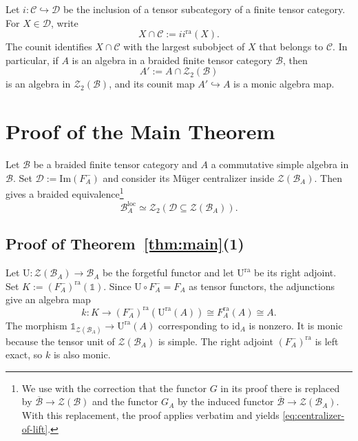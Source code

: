 \documentclass[11pt,reqno]{amsart}
\numberwithin{equation}{section}
\theoremstyle{plain}
\theoremstyle{definition}
\theoremstyle{remark}
\newcommand{\unit}{\mathds{1}}
\newcommand{\B}{\mathcal{B}}
\newcommand{\C}{\mathcal{C}}
\newcommand{\D}{\mathcal{D}}
\newcommand{\Z}{\mathcal{Z}}
\newcommand{\loc}{\mathrm{loc}}
\newcommand{\ra}{\mathrm{ra}}
\newcommand{\im}{\mathrm{Im}}
\newcommand{\id}{\mathrm{id}}
\newcommand{\U}{\mathrm{U}}
\begin{document}
Let $i:\C\hookrightarrow\D$ be the inclusion of a tensor subcategory of a
finite tensor category. For $X\in\D$, write
\[
  X\cap\C:=i i^{\ra}(X).
\]
The counit identifies $X\cap\C$ with the
largest subobject of $X$ that belongs to $\C$. In particular, if $A$ is an
algebra in a braided finite tensor category $\B$, then
\[
  A':=A\cap\Z_2(\B)
\]
is an algebra in $\Z_2(\B)$, and its counit map $A'\hookrightarrow A$ is a
monic algebra map.





\section{Proof of the Main Theorem}
\label{sec:main-theorem}

Let $\B$ be a braided finite tensor category and $A$ a commutative simple algebra in $\B$. 
Set $\D:=\im(F_A^-)$ and consider its M\"uger centralizer 
inside $\Z(\B_A)$. Then
\cite[Theorem~5.13]{shimizu2026commutative} gives a braided equivalence\footnote{We use \cite[Theorem~5.13]{shimizu2026commutative} with the correction that the functor $G$ in its proof there is replaced by $\overline{\mathcal B}\to\mathcal Z(\mathcal B)$ and the functor $G_A$ by the induced functor $\overline{\B}\to\Z(\B_A)$. With this replacement, the proof applies verbatim and yields \eqref{eq:centralizer-of-lift}.}
\begin{equation}\label{eq:centralizer-of-lift}
  \B_A^{\loc}
  \simeq
  \Z_2(\D\subseteq\Z(\B_A)).
\end{equation}



\subsection{Proof of Theorem~\ref{thm:main}(1)}
Let $\U:\Z(\B_A)\to\B_A$ be the forgetful functor and let $\U^{\ra}$ be its
right adjoint. Set $K:=(F_A^-)^\ra(\unit)$.
Since $\U\circ F_A^-=F_A$ as tensor functors, the adjunctions
give an algebra map
\[
  k:K\longrightarrow (F_A^-)^{\ra}(\U^{\ra}(A))
  \cong F_A^{\ra}(A)
  \cong A.
\]
The morphism $\unit_{\Z(\B_A)}\to\U^{\ra}(A)$ corresponding to $\id_A$ is
nonzero. It is monic because the tensor unit of $\Z(\B_A)$ is simple. The
right adjoint $(F_A^-)^{\ra}$ is left exact, so $k$ is also monic.
\end{document}
